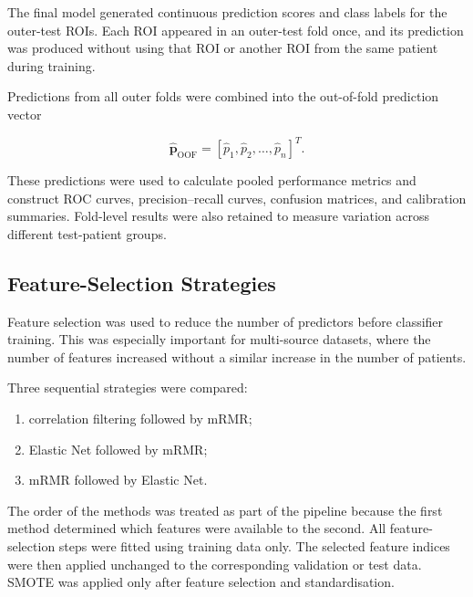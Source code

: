 \documentclass[12pt,twocolumn]{article}
\begin{document}
The final model generated continuous prediction scores and class labels
for the outer-test ROIs. Each ROI appeared in an outer-test fold once,
and its prediction was produced without using that ROI or another ROI
from the same patient during training.

Predictions from all outer folds were combined into the out-of-fold
prediction vector

\begin{equation}
\widehat{\mathbf{p}}_{\mathrm{OOF}}
=
\left[
\widehat{p}_1,
\widehat{p}_2,
\ldots,
\widehat{p}_n
\right]^T.
\label{eq:oof_predictions}
\end{equation}

These predictions were used to calculate pooled performance metrics
and construct ROC curves, precision--recall curves, confusion matrices,
and calibration summaries. Fold-level results were also retained to
measure variation across different test-patient groups.









\subsection{Feature-Selection Strategies}
\label{subsec:feature_selection}

Feature selection was used to reduce the number of predictors before
classifier training. This was especially important for multi-source
datasets, where the number of features increased without a similar
increase in the number of patients.

Three sequential strategies were compared:

\begin{enumerate}
    \item correlation filtering followed by mRMR;
    \item Elastic Net followed by mRMR;
    \item mRMR followed by Elastic Net.
\end{enumerate}

The order of the methods was treated as part of the pipeline because
the first method determined which features were available to the
second. All feature-selection steps were fitted using training data
only. The selected feature indices were then applied unchanged to the
corresponding validation or test data. SMOTE was applied only after
feature selection and standardisation.
\end{document}
